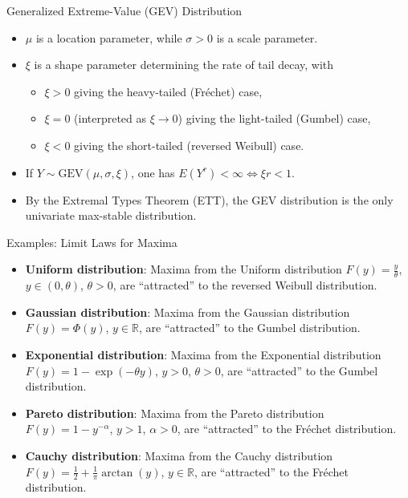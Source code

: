 \documentclass[10pt, hyperref={colorlinks = true,linkcolor = blue}]{beamer}
\begin{document}
{{\begin{frame}{Generalized Extreme-Value (GEV) Distribution}
\begin{itemize}
    \item $\mu$ is a location parameter, while $\sigma > 0$ is a scale parameter.
    \item $\xi$ is a shape parameter determining the rate of tail decay, with
    \begin{itemize}
        \item $\xi > 0$ giving the heavy-tailed (Fréchet) case,
        \item $\xi = 0$ (interpreted as $\xi \to 0$) giving the light-tailed (Gumbel) case,
        \item $\xi < 0$ giving the short-tailed (reversed Weibull) case.
    \end{itemize}
    \item If $Y \sim \text{GEV}(\mu, \sigma, \xi)$, one has $E(Y^r) < \infty \iff \xi r < 1$.
    \item By the Extremal Types Theorem (ETT), the GEV distribution is the only univariate max-stable distribution.
\end{itemize}


\end{frame}

\begin{frame}{Examples: Limit Laws for Maxima}
\begin{itemize}
   \item \textbf{Uniform distribution}: Maxima from the Uniform distribution $F(y) = \frac{y}{\theta}$, $y \in (0, \theta)$, $\theta > 0$, are “attracted” to the reversed Weibull distribution.
    \item \textbf{Gaussian distribution}: Maxima from the Gaussian distribution $F(y) = \Phi(y)$, $y \in \mathbb{R}$, are “attracted” to the Gumbel distribution.
    \item \textbf{Exponential distribution}: Maxima from the Exponential distribution $F(y) = 1 - \exp(-\theta y)$, $y > 0$, $\theta > 0$, are “attracted” to the Gumbel distribution.
    \item \textbf{Pareto distribution}: Maxima from the Pareto distribution $F(y) = 1 - y^{-\alpha}$, $y > 1$, $\alpha > 0$, are “attracted” to the Fréchet distribution.
    \item \textbf{Cauchy distribution}: Maxima from the Cauchy distribution $F(y) = \frac{1}{2} + \frac{1}{\pi} \arctan(y)$, $y \in \mathbb{R}$, are “attracted” to the Fréchet distribution.
\end{itemize}
\end{frame}

}}
\end{document}
